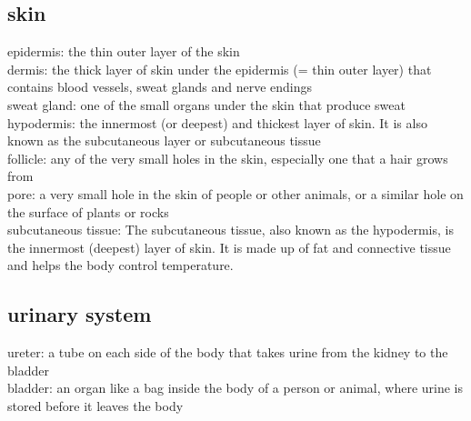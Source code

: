 \documentclass{article}
\begin{document}
\subsection{skin}
epidermis: the thin outer layer of the skin\\
dermis: the thick layer of skin under the epidermis (= thin outer layer) that contains blood vessels, sweat glands and nerve endings\\
sweat gland: one of the small organs under the skin that produce sweat\\
hypodermis: the innermost (or deepest) and thickest layer of skin. It is also known as the subcutaneous layer or subcutaneous tissue\\
follicle: any of the very small holes in the skin, especially one that a hair grows from\\
pore: a very small hole in the skin of people or other animals, or a similar hole on the surface of plants or rocks\\
subcutaneous tissue: The subcutaneous tissue, also known as the hypodermis, is the innermost (deepest) layer of skin. It is made up of fat and connective tissue and helps the body control temperature.\\


\subsection{urinary system}
ureter: a tube on each side of the body that takes urine from the kidney to the bladder\\
bladder: an organ like a bag inside the body of a person or animal, where urine is stored before it leaves the body\\
\end{document}
